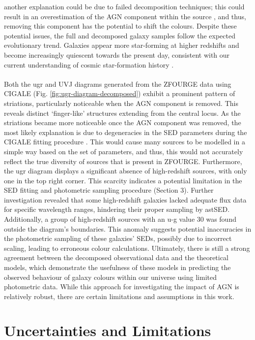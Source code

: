 another explanation could be due to failed decomposition techniques; this could result in an overestimation of the AGN component within the source \citep{ciesla_constraining_2015}, and thus, removing this component has the potential to shift the colours. Despite these potential issues, the full and decomposed galaxy samples follow the expected evolutionary trend. Galaxies appear more star-forming at higher redshifts and become increasingly quiescent towards the present day, consistent with our current understanding of cosmic star-formation history \citep{kim_cosmic_2024}. \\\\ Both the ugr and UVJ diagrams generated from the ZFOURGE data using CIGALE (Fig. \ref{fig:ugr-diagram-decomposed}) exhibit a prominent pattern of striations, particularly noticeable when the AGN component is removed. This reveals distinct `finger-like' structures extending from the central locus. As the striations became more noticeable once the AGN component was removed, the most likely explanation is due to degeneracies in the SED parameters during the CIGALE fitting procedure \citep{yang_x-cigale_2020}. This would cause many sources to be modelled in a simple way based on the set of parameters, and thus, this would not accurately reflect the true diversity of sources that is present in ZFOURGE.
Furthermore, the ugr diagram displays a significant absence of high-redshift sources, with only one in the top right corner. This scarcity indicates a potential limitation in the SED fitting and photometric sampling procedure (Section 3).  Further investigation revealed that some high-redshift galaxies lacked adequate flux data for specific wavelength ranges, hindering their proper sampling by astSED.
Additionally, a group of high-redshift sources with an u-g value 30 was found outside the diagram's boundaries. This anomaly suggests potential inaccuracies in the photometric sampling of these galaxies' SEDs, possibly due to incorrect scaling, leading to erroneous colour calculations. Ultimately, there is still a strong agreement between the decomposed observational data and the theoretical models, which demonstrate the usefulness of these models in predicting the observed behaviour of galaxy colours within our universe using limited photometric data. While this approach for investigating the impact of AGN is relatively robust, there are certain limitations and assumptions in this work.
\section{Uncertainties and Limitations}
